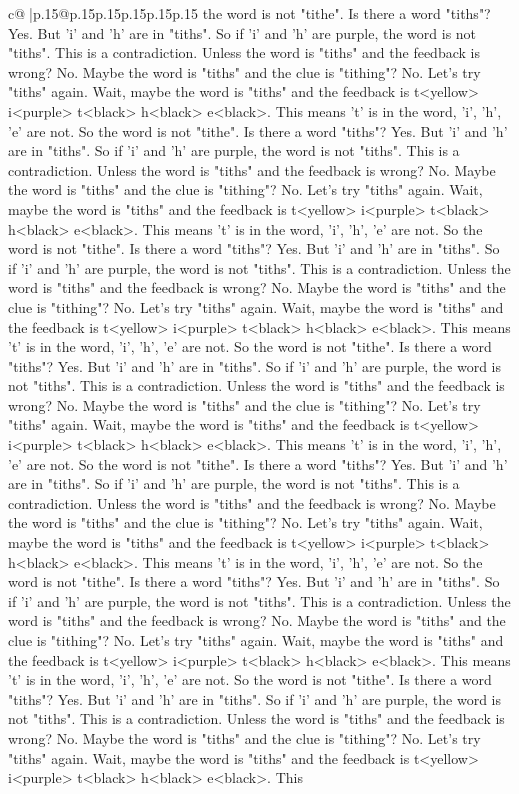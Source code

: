 \documentclass{article}
\begin{document}
{\begin{supertabular}{c@{$\;$}|p{.15\linewidth}@{}p{.15\linewidth}p{.15\linewidth}p{.15\linewidth}p{.15\linewidth}p{.15\linewidth}}
{{{the word is not "tithe". Is there a word "tiths"? Yes. But 'i' and 'h' are in "tiths". So if 'i' and 'h' are purple, the word is not "tiths". This is a contradiction. Unless the word is "tiths" and the feedback is wrong? No. Maybe the word is "tiths" and the clue is "tithing"? No. Let's try "tiths" again. Wait, maybe the word is "tiths" and the feedback is t<yellow> i<purple> t<black> h<black> e<black>. This means 't' is in the word, 'i', 'h', 'e' are not. So the word is not "tithe". Is there a word "tiths"? Yes. But 'i' and 'h' are in "tiths". So if 'i' and 'h' are purple, the word is not "tiths". This is a contradiction. Unless the word is "tiths" and the feedback is wrong? No. Maybe the word is "tiths" and the clue is "tithing"? No. Let's try "tiths" again. Wait, maybe the word is "tiths" and the feedback is t<yellow> i<purple> t<black> h<black> e<black>. This means 't' is in the word, 'i', 'h', 'e' are not. So the word is not "tithe". Is there a word "tiths"? Yes. But 'i' and 'h' are in "tiths". So if 'i' and 'h' are purple, the word is not "tiths". This is a contradiction. Unless the word is "tiths" and the feedback is wrong? No. Maybe the word is "tiths" and the clue is "tithing"? No. Let's try "tiths" again. Wait, maybe the word is "tiths" and the feedback is t<yellow> i<purple> t<black> h<black> e<black>. This means 't' is in the word, 'i', 'h', 'e' are not. So the word is not "tithe". Is there a word "tiths"? Yes. But 'i' and 'h' are in "tiths". So if 'i' and 'h' are purple, the word is not "tiths". This is a contradiction. Unless the word is "tiths" and the feedback is wrong? No. Maybe the word is "tiths" and the clue is "tithing"? No. Let's try "tiths" again. Wait, maybe the word is "tiths" and the feedback is t<yellow> i<purple> t<black> h<black> e<black>. This means 't' is in the word, 'i', 'h', 'e' are not. So the word is not "tithe". Is there a word "tiths"? Yes. But 'i' and 'h' are in "tiths". So if 'i' and 'h' are purple, the word is not "tiths". This is a contradiction. Unless the word is "tiths" and the feedback is wrong? No. Maybe the word is "tiths" and the clue is "tithing"? No. Let's try "tiths" again. Wait, maybe the word is "tiths" and the feedback is t<yellow> i<purple> t<black> h<black> e<black>. This means 't' is in the word, 'i', 'h', 'e' are not. So the word is not "tithe". Is there a word "tiths"? Yes. But 'i' and 'h' are in "tiths". So if 'i' and 'h' are purple, the word is not "tiths". This is a contradiction. Unless the word is "tiths" and the feedback is wrong? No. Maybe the word is "tiths" and the clue is "tithing"? No. Let's try "tiths" again. Wait, maybe the word is "tiths" and the feedback is t<yellow> i<purple> t<black> h<black> e<black>. This means 't' is in the word, 'i', 'h', 'e' are not. So the word is not "tithe". Is there a word "tiths"? Yes. But 'i' and 'h' are in "tiths". So if 'i' and 'h' are purple, the word is not "tiths". This is a contradiction. Unless the word is "tiths" and the feedback is wrong? No. Maybe the word is "tiths" and the clue is "tithing"? No. Let's try "tiths" again. Wait, maybe the word is "tiths" and the feedback is t<yellow> i<purple> t<black> h<black> e<black>. This }}}
\end{supertabular}}
\end{document}
